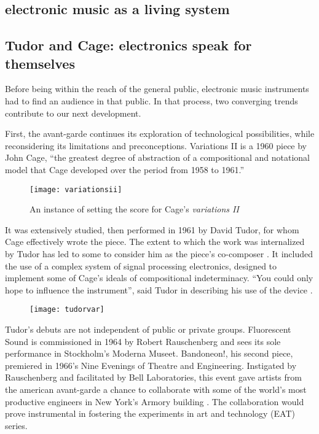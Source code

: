 \begin{itemize}
\section{electronic music as a living system}

\subsection{Tudor and Cage: electronics speak for themselves}

	Before being within the reach of the general public, electronic music instruments had to find an audience in that public. In that process, two converging trends contribute to our next development. 
	
	First, the avant-garde continues its exploration of technological possibilities, while reconsidering its limitations and preconceptions. Variations II is a 1960 piece by John Cage, “the greatest degree of abstraction of a compositional and notational model that Cage developed over the period from 1958 to 1961.”
	
\begin{figure}[h!]
  \caption{An instance of setting the score for Cage's \emph{variations II}}
  \centering
    \texttt{[image: variationsii]}
\end{figure}
	
	 It was extensively studied, then performed in 1961 by David Tudor, for whom Cage effectively wrote the piece. The extent to which the work was internalized by Tudor has led to some to consider him as the piece’s co-composer \cite{pritchett2004}. It included the use of a complex system of signal processing electronics, designed to implement some of Cage’s ideals of compositional indeterminacy. “You could only hope to influence the instrument”, said Tudor in describing his use of the device \cite{nakai2014}. 
	 
 	\begin{figure}[h!]
 	  \caption{}
 	  \centering
 	    \texttt{[image: tudorvar]}
 	\end{figure}

Tudor’s debuts are not independent of public or private groups. Fluorescent Sound is commissioned in 1964 by Robert Rauschenberg and sees its sole performance in Stockholm’s Moderna Museet. Bandoneon!, his second piece, premiered in 1966’s Nine Evenings of Theatre and Engineering. Instigated by Rauschenberg and facilitated by Bell Laboratories, this event gave artists from the american avant-garde a chance to collaborate with some of the world’s most productive engineers in New York’s Armory building \cite{kuivila2004}. The collaboration would prove instrumental in fostering the experiments in art and technology (EAT) series. 
	

\end{itemize}
